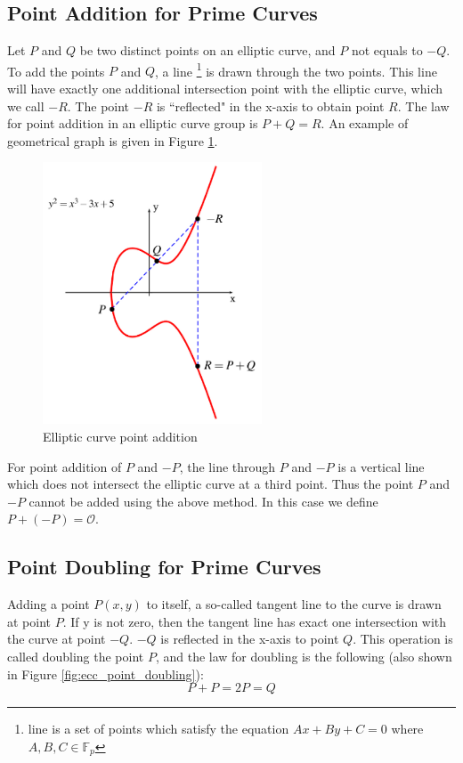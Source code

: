 \subsection*{Point Addition for Prime Curves}
Let $P$ and $Q$ be two distinct points on an elliptic curve, and $P$ not equals to $-Q$. To add the points $P$ and $Q$, a line \footnote{line is a set of points which satisfy the equation $Ax+By+C = 0$ where $A,B,C \in \mathbb{F}_p$} is drawn through the two points. This line will have exactly one additional intersection point with the elliptic curve, which we call $-R$. The point $-R$ is ``reflected" in the x-axis to obtain point $R$. The law for point addition in an elliptic curve group is $P+Q=R$.  An example of geometrical graph is given in Figure \ref{fig:ecc_point_addition}. 
    \begin{figure}[h!]
    	\centering
    	\includegraphics[width=65mm]{./pics/ecc_point_addition.png}
    	\caption[Elliptic curve point addition]{Elliptic curve point addition \cite{ECCPic}}
    	\label{fig:ecc_point_addition}
    \end{figure}
    
For point addition of $P$ and $-P$, the line through $P$ and $-P$ is a vertical line which does not intersect the elliptic curve at a third point. Thus the point $P$ and $-P$ cannot be added using the above method. In this case we define $P + (-P) = \mathcal{O}$. 

\subsection*{Point Doubling for Prime Curves}
Adding a point $P(x,y)$ to itself, a so-called tangent line to the curve is drawn at point $P$. If y is not zero, then the tangent line has exact one intersection with the curve at point $-Q$. $-Q$ is reflected in the x-axis to point $Q$. This operation is called doubling the point $P$, and the law for doubling is the following (also shown in Figure \ref{fig:ecc_point_doubling}): 
$$P+P=2P=Q$$ 

